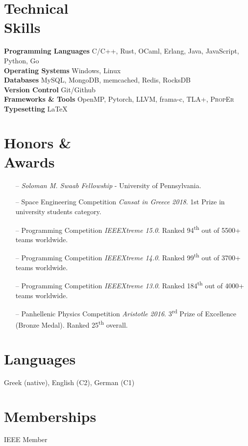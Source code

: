 \documentclass[margin]{res}
\newcommand{\field}[2]{\noindent \textbf{#1} \hfill #2 \\}
\begin{document}
\begin{resume}
\section{Technical \\ Skills}

\field{Programming Languages}  {C/C++, Rust, OCaml, Erlang, Java, JavaScript, Python, Go} 
\field{Operating Systems} {Windows, Linux}
\field{Databases} {MySQL, MongoDB, memcached, Redis, RocksDB}
\field{Version Control} {Git/Github}
\field{Frameworks \& Tools} {OpenMP, Pytorch, LLVM, frama-c, TLA+, \textsc{PropEr}}
\field{Typesetting} {\LaTeX}

\section{Honors \& \\ Awards} 

\begin{itemize}[nosep]
  \item[--] 
    \emph{Soloman M. Swaab Fellowship} - University of Pennsylvania.
	\item[--] 
    Space Engineering Competition \emph{Cansat in Greece 2018}.
    1st Prize in university students category.
  \item[--] 
    Programming Competition \emph{IEEEXtreme 15.0}.
    Ranked 94\textsuperscript{th} out of 5500+ teams worldwide.
  \item[--] 
    Programming Competition \emph{IEEEXtreme 14.0}.
    Ranked 99\textsuperscript{th} out of 3700+ teams worldwide.
  \item[--] 
    Programming Competition \emph{IEEEXtreme 13.0}.
    Ranked 184\textsuperscript{th} out of 4000+ teams worldwide.
  \item[--] 
    Panhellenic Physics Competition \emph{Aristotle 2016}.
    3\textsuperscript{rd} Prize of Excellence (Bronze Medal). 
    Ranked 25\textsuperscript{th} overall.
\end{itemize}

\section{Languages} Greek (native), English (C2), German (C1)

\section{Memberships} IEEE Member

\begin{comment}

\end{comment}
\end{resume}
\end{document}
